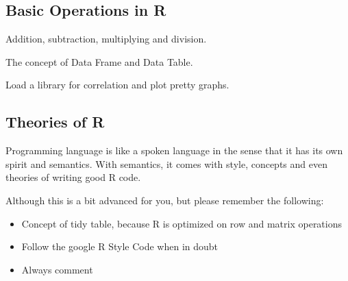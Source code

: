 \subsection{Basic Operations in R}

Addition, subtraction, multiplying and division.  

The concept of Data Frame and Data Table.  

Load a library for correlation and plot pretty graphs.  

\subsection{Theories of R}

Programming language is like a spoken language in the sense that it has its own spirit and semantics.  With semantics, it comes with style, concepts and even theories of writing good R code.  

Although this is a bit advanced for you, but please remember the following:

\begin{itemize}
\item Concept of tidy table, because R is optimized on row and matrix operations 
\item Follow the google R Style Code when in doubt
\item Always comment 
\end{itemize}

\newpage